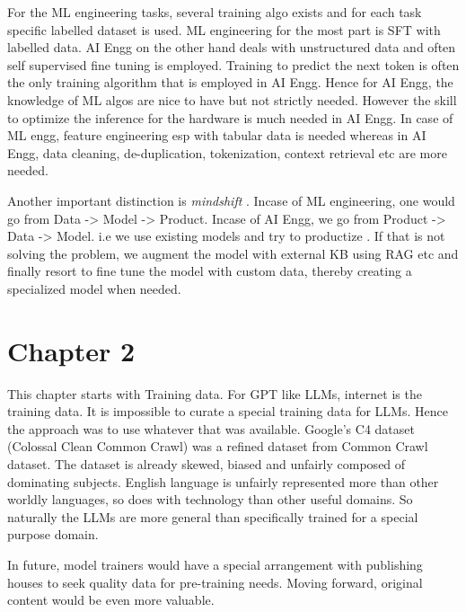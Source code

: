 \documentclass[
  letterpaper,
  DIV=11,
  numbers=noendperiod]{scrreprt}
\begin{document}
For the ML engineering tasks, several training algo exists and for each
task specific labelled dataset is used. ML engineering for the most part
is SFT with labelled data. AI Engg on the other hand deals with
unstructured data and often self supervised fine tuning is employed.
Training to predict the next token is often the only training algorithm
that is employed in AI Engg. Hence for AI Engg, the knowledge of ML
algos are nice to have but not strictly needed. However the skill to
optimize the inference for the hardware is much needed in AI Engg. In
case of ML engg, feature engineering esp with tabular data is needed
whereas in AI Engg, data cleaning, de-duplication, tokenization, context
retrieval etc are more needed.

Another important distinction is \emph{mindshift} . Incase of ML
engineering, one would go from Data -\textgreater{} Model
-\textgreater{} Product. Incase of AI Engg, we go from Product
-\textgreater{} Data -\textgreater{} Model. i.e we use existing models
and try to productize . If that is not solving the problem, we augment
the model with external KB using RAG etc and finally resort to fine tune
the model with custom data, thereby creating a specialized model when
needed.


\chapter*{Chapter 2}\label{chapter-2}


This chapter starts with Training data. For GPT like LLMs, internet is
the training data. It is impossible to curate a special training data
for LLMs. Hence the approach was to use whatever that was available.
Google's C4 dataset (Colossal Clean Common Crawl) was a refined dataset
from Common Crawl dataset. The dataset is already skewed, biased and
unfairly composed of dominating subjects. English language is unfairly
represented more than other worldly languages, so does with technology
than other useful domains. So naturally the LLMs are more general than
specifically trained for a special purpose domain.

In future, model trainers would have a special arrangement with
publishing houses to seek quality data for pre-training needs. Moving
forward, original content would be even more valuable.
\end{document}
